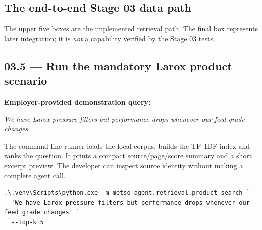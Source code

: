 \documentclass[11pt,a4paper]{article}
\DeclareRobustCommand{\code}[1]{{\ttfamily\small\detokenize{#1}}}
\begin{document}
\subsection{The end-to-end Stage 03 data path}
\begin{center}
\end{center}
The upper five boxes are the implemented retrieval path. The final box represents later integration; it is \emph{not} a capability verified by the Stage 03 tests.

\subsection{03.5 --- Run the mandatory Larox product scenario}
\textbf{Employer-provided demonstration query:}
\begin{examplebox}
\emph{We have Larox pressure filters but performance drops whenever our feed grade changes}
\end{examplebox}
The command-line runner loads the local corpus, builds the TF--IDF index and ranks the question. It prints a compact source/page/score summary and a short excerpt preview. The developer can inspect source identity without making a complete agent call.

\begin{Verbatim}[fontsize=\footnotesize]
.\.venv\Scripts\python.exe -m metso_agent.retrieval.product_search `
  'We have Larox pressure filters but performance drops whenever our feed grade changes' `
  --top-k 5
\end{Verbatim}
\end{document}
